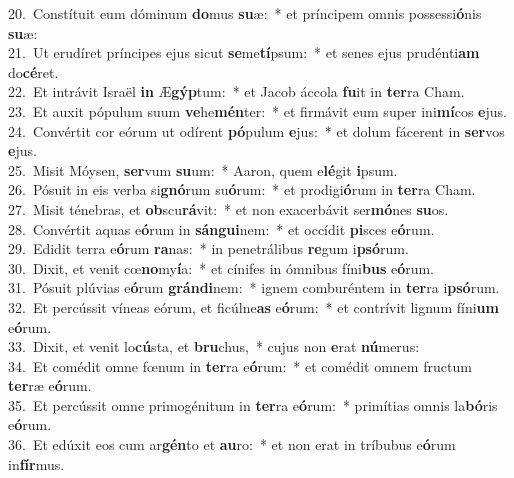 {20.~}Constítuit eum dóminum \textbf{do}mus \textbf{su}æ:~* et príncipem omnis possessi\textbf{ó}nis \textbf{su}æ:\\
{21.~}Ut erudíret príncipes ejus sicut \textbf{se}me\textbf{tí}psum:~* et senes ejus prudénti\textbf{am} do\textbf{cé}ret.\\
{22.~}Et intrávit Israël \textbf{in} Æ\textbf{gýp}tum:~* et Jacob áccola \textbf{fu}it in \textbf{ter}ra Cham.\\
{23.~}Et auxit pópulum suum \textbf{ve}he\textbf{mén}ter:~* et firmávit eum super ini\textbf{mí}cos \textbf{e}jus.\\
{24.~}Convértit cor eórum ut odírent \textbf{pó}pulum \textbf{e}jus:~* et dolum fácerent in \textbf{ser}vos \textbf{e}jus.\\
{25.~}Misit Móysen, \textbf{ser}vum \textbf{su}um:~* Aaron, quem e\textbf{lé}git \textbf{i}psum.\\
{26.~}Pósuit in eis verba si\textbf{gnó}rum su\textbf{ó}rum:~* et prodigi\textbf{ó}rum in \textbf{ter}ra Cham.\\
{27.~}Misit ténebras, et \textbf{ob}scu\textbf{rá}vit:~* et non exacerbávit ser\textbf{mó}nes \textbf{su}os.\\
{28.~}Convértit aquas e\textbf{ó}rum in \textbf{sán}\textbf{gui}nem:~* et occídit \textbf{pi}sces e\textbf{ó}rum.\\
{29.~}Edidit terra e\textbf{ó}rum \textbf{ra}nas:~* in penetrálibus \textbf{re}gum i\textbf{psó}rum.\\
{30.~}Dixit, et venit cœ\textbf{no}my\textbf{í}a:~* et cínifes in ómnibus fíni\textbf{bus} e\textbf{ó}rum.\\
{31.~}Pósuit plúvias e\textbf{ó}rum \textbf{grán}\textbf{di}nem:~* ignem comburéntem in \textbf{ter}ra i\textbf{psó}rum.\\
{32.~}Et percússit víneas eórum, et ficúlne\textbf{as} e\textbf{ó}rum:~* et contrívit lignum fíni\textbf{um} e\textbf{ó}rum.\\
{33.~}Dixit, et venit lo\textbf{cú}sta, et \textbf{bru}chus,~* cujus non \textbf{e}rat \textbf{nú}merus:\\
{34.~}Et comédit omne fœnum in \textbf{ter}ra e\textbf{ó}rum:~* et comédit omnem fructum \textbf{ter}ræ e\textbf{ó}rum.\\
{35.~}Et percússit omne primogénitum in \textbf{ter}ra e\textbf{ó}rum:~* primítias omnis la\textbf{bó}ris e\textbf{ó}rum.\\
{36.~}Et edúxit eos cum ar\textbf{gén}to et \textbf{au}ro:~* et non erat in tríbubus e\textbf{ó}rum in\textbf{fír}mus.\\

